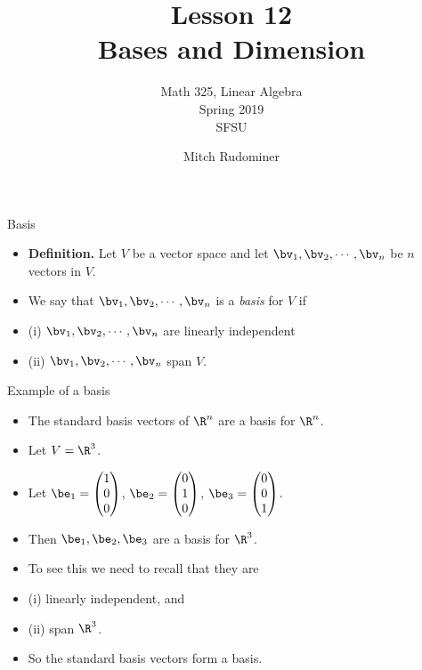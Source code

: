 \documentclass{beamer}
\title{Lesson 12 \\ Bases and Dimension}
\subtitle{Math 325, Linear Algebra \\ Spring 2019 \\ SFSU}
\author{Mitch Rudominer}
\date{}
\begin{document}
\begin{frame}
  \titlepage
\end{frame}


\begin{frame}{Basis}

\begin{itemize}
\item \textbf{Definition.} Let $V$ be a vector space and let $\bv_1,\bv_2,\cdots,\bv_n$ be $n$ vectors in $V$.
\item We say that $\bv_1,\bv_2,\cdots,\bv_n$ is a \emph{basis} for $V$ if
\item (i) $\bv_1,\bv_2,\cdots,\bv_n$ are linearly independent
\item (ii) $\bv_1,\bv_2,\cdots,\bv_n$ span $V$.
\end{itemize}
\end{frame}

\begin{frame}{Example of a basis}

\begin{itemize}
\item The standard basis vectors of $\R^n$ are a basis for $\R^n$.
\item Let $V = \R^3$.
\item Let $\be_1 =
\begin{pmatrix}
1 \\ 0 \\ 0
\end{pmatrix}
$,
$\be_2 =
\begin{pmatrix}
0 \\ 1 \\ 0
\end{pmatrix}
$,
$\be_3=
\begin{pmatrix}
0 \\ 0 \\ 1
\end{pmatrix}
$.

\item Then $\be_1,\be_2,\be_3$ are a basis for $\R^3$.
\item To see this we need to recall that they are
\item (i) linearly independent, and
\item (ii) span $\R^3$.
\item So the standard basis vectors form a basis.
\end{itemize}

\end{frame}
\end{document}
